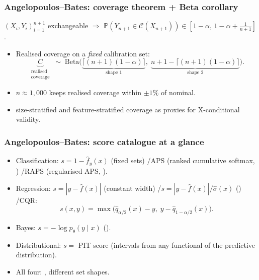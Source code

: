 \documentclass[11pt, aspectratio=169, xcolor={dvipsnames}, usepdftitle=false]{beamer}
\begin{document}
\begin{frame}
\frametitle{Angelopoulos--Bates: coverage theorem + Beta corollary}
\begin{theorem}
$(X_i, Y_i)_{i=1}^{n+1}$ exchangeable $\Rightarrow$ $\mathbb{P}(Y_{n+1} \in \mathcal{C}(X_{n+1})) \in [1{-}\alpha,\, 1{-}\alpha + \tfrac{1}{n+1}]$.
\end{theorem}
\begin{itemize}
\item Realised coverage on a \emph{fixed} calibration set:
\begin{equation*}
\underbrace{C}_{\substack{\text{realised}\\\text{coverage}}}
\;\sim\;
\text{Beta}\bigl(
\underbrace{\lceil (n+1)(1-\alpha)\rceil}_{\text{shape 1}},\;
\underbrace{n+1-\lceil (n+1)(1-\alpha)\rceil}_{\text{shape 2}}
\bigr).
\end{equation*}
\item {} $n \approx 1{,}000$ keeps realised coverage within $\pm 1\%$ of nominal.
\item {} size-stratified and feature-stratified coverage as proxies for X-conditional validity.
\end{itemize}
\end{frame}

\begin{frame}
\frametitle{Angelopoulos--Bates: score catalogue at a glance}
\begin{itemize}
\item Classification: $s = 1 - \hat{f}_y(x)$ (fixed sets) \quad/\quad APS (ranked cumulative softmax, ) \quad/\quad RAPS (regularised APS, ).
\item Regression: $s = |y - \hat{f}(x)|$ (constant width) \quad/\quad $s = |y - \hat{f}(x)|/\hat{\sigma}(x)$ () \quad/\quad CQR:
\begin{equation*}
s(x, y) = \max\bigl(\hat{q}_{\alpha/2}(x) - y,\; y - \hat{q}_{1-\alpha/2}(x)\bigr).
\end{equation*}
\item Bayes: $s = -\log p_\theta(y \mid x)$ ().
\item Distributional: $s = $ PIT score (intervals from any functional of the predictive distribution).
\item All four: , different set shapes.
\end{itemize}
\end{frame}
\end{document}
